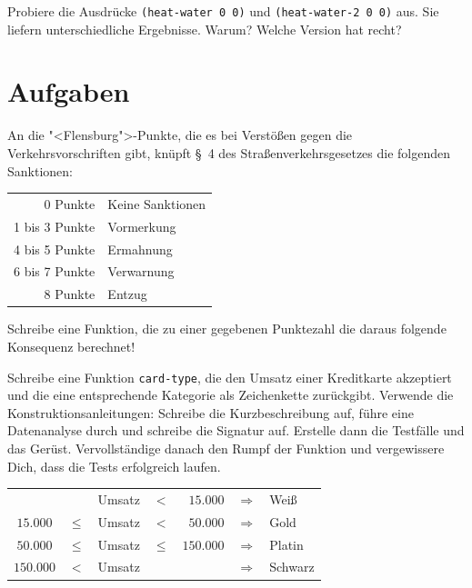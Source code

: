 \begin{aufgabeinline}
  Probiere die Ausdrücke \lstinline{(heat-water 0 0)} und
  \lstinline{(heat-water-2 0 0)} aus.  Sie liefern unterschiedliche
  Ergebnisse.  Warum?  Welche Version hat recht?
\end{aufgabeinline}

\section*{Aufgaben}

\begin{aufgabe}
An die "<Flensburg">-Punkte, die es bei Verstößen gegen die
Verkehrsvorschriften gibt, knüpft \S~4 des Straßenverkehrsgesetzes die folgenden Sanktionen:
%
\begin{center}
  \begin{tabular}{rl}
    0 Punkte & Keine Sanktionen\\
    1 bis 3 Punkte & Vormerkung\\
    4 bis 5 Punkte & Ermahnung\\
    6 bis 7 Punkte & Verwarnung\\
    8 Punkte & Entzug
  \end{tabular}
\end{center}
%
Schreibe eine Funktion, die zu einer gegebenen Punktezahl die daraus
folgende Konsequenz berechnet!
\end{aufgabe}

\begin{aufgabe}
  Schreibe eine Funktion \lstinline{card-type}, die den Umsatz einer
  Kreditkarte akzeptiert und die eine entsprechende Kategorie als
  Zeichenkette zurückgibt.  Verwende die Konstruktionsanleitungen:
  Schreibe die Kurzbeschreibung auf, führe eine
  Datenanalyse durch und schreibe die Signatur auf. Erstelle
  dann die Testfälle und das Gerüst.  Vervollständige danach den
  Rumpf der Funktion und vergewissere Dich, dass die Tests
  erfolgreich laufen. \\

  \begin{tabular}{crlcrll}
    &        & Umsatz & $<$ & $15.000$   & $\Longrightarrow$ & Weiß \\
    $15.000$  & $\leq$ & Umsatz & $<$ & $50.000 $  & $\Longrightarrow$ & Gold \\
    $50.000$  & $\leq$ & Umsatz & $\leq$ & $150.000 $ 
    & $\Longrightarrow$ & Platin \\
    $150.000$ & $<$ & Umsatz &     &            &  $\Longrightarrow$ & Schwarz \\
  \end{tabular} \\
\end{aufgabe}

